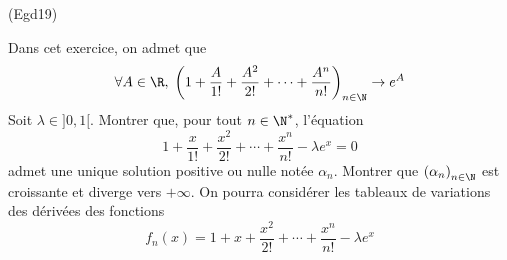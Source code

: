 \begin{tiny}(Egd19)\end{tiny} Dans cet exercice, on admet que
\begin{displaymath}
 \forall A\in \R,\;\left( 1+\frac{A}{1!}+\frac{A^2}{2!}+\cdots +\frac{A^n}{n!}\right) _{n\in \N} \rightarrow e^A
\end{displaymath}
Soit $\lambda\in ]0,1[$. Montrer que, pour tout $n \in \N^*$, l'équation 
\begin{displaymath}
 1+\frac{x}{1!}+\frac{x^2}{2!}+\cdots+\frac{x^n}{n!} -\lambda e^x = 0
\end{displaymath}
admet une unique solution positive ou nulle notée $\alpha_n$. Montrer que $\left( \alpha_n\right) _{n\in \N}$ est croissante et diverge vers $+\infty$.\newline
On pourra considérer les tableaux de variations des dérivées des fonctions
\begin{displaymath}
 f_{n}(x) = 1 +x + \frac{x^2}{2!}+\cdots+\frac{x^n}{n!}-\lambda e^x
\end{displaymath}

